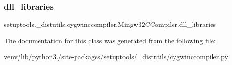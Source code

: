 \subsubsection{\texorpdfstring{dll\+\_\+libraries}{dll\_libraries}}
{\footnotesize\ttfamily setuptools.\+\_\+distutils.\+cygwinccompiler.\+Mingw32\+C\+Compiler.\+dll\+\_\+libraries}



The documentation for this class was generated from the following file\+:\begin{DoxyCompactItemize}
\item 
venv/lib/python3./site-\/packages/setuptools/\+\_\+distutils/\hyperlink{cygwinccompiler_8py}{cygwinccompiler.\+py}\end{DoxyCompactItemize}
